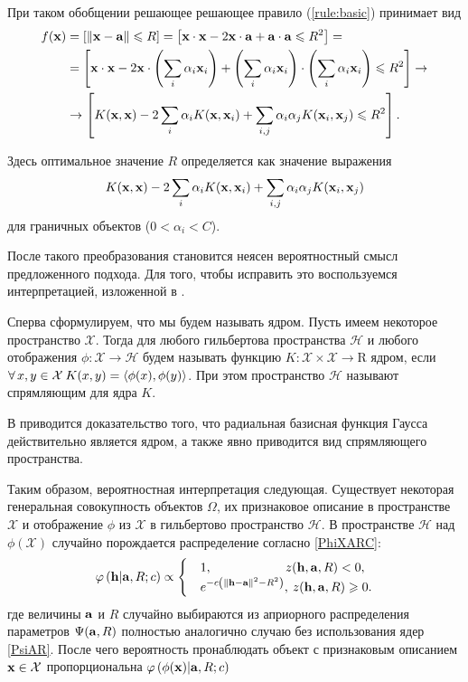 При таком обобщении решающее решающее правило (\ref{rule:basic}) принимает вид 
\begin{align}
	\label{rule:kernel}
	f(\boldsymbol{\mathbf{x}}) 
		&= 	\left[\left\|{\boldsymbol{\mathbf{x}}-\boldsymbol{\mathbf{a}}}\right\| \leqslant R\right] 
		= 	\left[\boldsymbol{\mathbf{x}}\cdot\boldsymbol{\mathbf{x}} - 2\boldsymbol{\mathbf{x}}\cdot\boldsymbol{\mathbf{a}} + \boldsymbol{\mathbf{a}}\cdot\boldsymbol{\mathbf{a}} \leqslant R^2\right] = \notag \\
		&= 	\left[\boldsymbol{\mathbf{x}}\cdot\boldsymbol{\mathbf{x}} - 2\boldsymbol{\mathbf{x}}\cdot\left(\sum\limits_{i} \alpha_i \boldsymbol{\mathbf{x}}_i\right) + \left(\sum\limits_{i} \alpha_i \boldsymbol{\mathbf{x}}_i\right)\cdot\left(\sum\limits_{i} \alpha_i \boldsymbol{\mathbf{x}}_i\right) \leqslant R^2\right] \to \notag \\
		&\to \left[K(\boldsymbol{\mathbf{x}},\boldsymbol{\mathbf{x}}) - 2\sum\limits_{i} \alpha_i K(\boldsymbol{\mathbf{x}}, \boldsymbol{\mathbf{x}}_i) + \sum\limits_{i,j} \alpha_i\alpha_jK(\boldsymbol{\mathbf{x}}_i,\boldsymbol{\mathbf{x}}_j) \leqslant R^2\right].
\end{align}

Здесь оптимальное значение $R$ определяется как значение выражения $$K(\boldsymbol{\mathbf{x}},\boldsymbol{\mathbf{x}}) - 2\sum\limits_{i} \alpha_i K(\boldsymbol{\mathbf{x}}, \boldsymbol{\mathbf{x}}_i) + \sum\limits_{i,j} \alpha_i\alpha_jK(\boldsymbol{\mathbf{x}}_i,\boldsymbol{\mathbf{x}}_j)$$ для граничных объектов ($0<\alpha_i<C$).

После такого преобразования становится неясен вероятностный смысл предложенного подхода. Для того, чтобы исправить это воспользуемся интерпретацией, изложенной в \cite{Merkov}. 

Сперва сформулируем, что мы будем называть ядром. Пусть имеем некоторое пространство $\mathcal X$. Тогда для любого гильбертова пространства $\mathcal H$ и любого отображения $\phi \colon \mathcal X \to \mathcal H$ будем называть функцию $K\colon \mathcal X\times\mathcal X\to \mathrm R$ ядром, если $\forall\,x,y\in \mathcal X\: K(x,y) =\left\langle\phi(x),\phi(y)\right\rangle$. При этом пространство $\mathcal H$ называют спрямляющим для ядра $K$.

В \cite{Steinwart} приводится доказательство того, что радиальная базисная функция Гаусса действительно является ядром, а также явно приводится вид спрямляющего пространства.

Таким образом, вероятностная интерпретация следующая. Существует некоторая генеральная совокупность объектов $\Omega$, их признаковое описание в пространстве $\mathcal X$ и отображение $\phi$ из $\mathcal X$ в гильбертово пространство $\mathcal H$. В пространстве $\mathcal H$ над $\phi(\mathcal X)$ случайно порождается распределение согласно \ref{PhiXARC}:
\begin{equation}
	\label{PhiHARC}
	\varphi \left( {\boldsymbol{\mathbf{h}} | \boldsymbol{\mathbf{a}},R;c} \right) \propto
		\begin{cases}
			&1, 				\qquad\qquad\qquad  	\! 	z(\boldsymbol{\mathbf{h}},\boldsymbol{\mathbf{a}},R) < 0, \\
			&e^{-c \left(\left\|{\boldsymbol{\mathbf{h}}-\boldsymbol{\mathbf{a}}}\right\|^2-R^2\right)}, 	\:	z(\boldsymbol{\mathbf{h}},\boldsymbol{\mathbf{a}},R) \geqslant 0.
		\end{cases}
\end{equation}
где величины $\boldsymbol{\mathbf{a}}$ и $R$ случайно выбираются из априорного распределения параметров $\Psi(\boldsymbol{\mathbf{a}},R)$ полностью аналогично случаю без использования ядер \ref{PsiAR}. 
После чего вероятность пронаблюдать объект с признаковым описанием $\boldsymbol{\mathbf{x}}\in \mathcal X$ пропорциональна $\varphi \left( {\phi(\boldsymbol{\mathbf{x}}) | \boldsymbol{\mathbf{a}},R;c} \right)$
